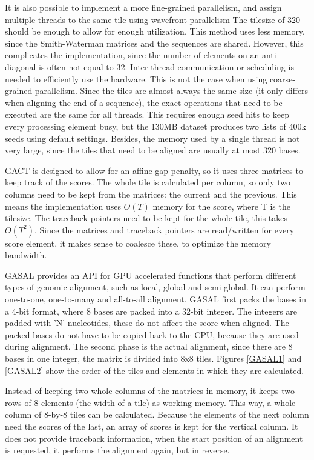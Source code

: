 \documentclass[../main/thesis.tex]{subfiles}
\begin{document}
It is also possible to implement a more fine-grained parallelism, and assign multiple threads to the same tile using wavefront parallelism %
The tilesize of 320 should be enough to allow for enough utilization.
This method uses less memory, since the Smith-Waterman matrices and the sequences are shared.
However, this complicates the implementation, since the number of elements on an anti-diagonal is often not equal to 32.
Inter-thread communication or scheduling is needed to efficiently use the hardware.
This is not the case when using coarse-grained parallelism.
Since the tiles are almost always the same size (it only differs when aligning the end of a sequence), the exact operations that need to be executed are the same for all threads.
This requires enough seed hits to keep every processing element busy, but the 130MB dataset produces two lists of 400k seeds using default settings. 
Besides, the memory used by a single thread is not very large, since the tiles that need to be aligned are usually at most 320 bases.

GACT is designed to allow for an affine gap penalty, so it uses three matrices to keep track of the scores.
The whole tile is calculated per column, so only two columns need to be kept from the matrices: the current and the previous.
This means the implementation uses $O(T)$ memory for the score, where T is the tilesize.
The traceback pointers need to be kept for the whole tile, this takes $O(T^2)$.
Since the matrices and traceback pointers are read/written for every score element, it makes sense to coalesce these, to optimize the memory bandwidth.

GASAL \cite{GASAL} provides an API for GPU accelerated functions that perform different types of genomic alignment, such as local, global and semi-global.
It can perform one-to-one, one-to-many and all-to-all alignment.
GASAL first packs the bases in a 4-bit format, where 8 bases are packed into a 32-bit integer.
The integers are padded with 'N' nucleotides, these do not affect the score when aligned.
The packed bases do not have to be copied back to the CPU, because they are used during alignment.
The second phase is the actual alignment, since there are 8 bases in one integer, the matrix is divided into 8x8 tiles.
Figures \ref{GASAL1} and \ref{GASAL2} show the order of the tiles and elements in which they are calculated.



Instead of keeping two whole columns of the matrices in memory, it keeps two rows of 8 elements (the width of a tile) as working memory.
This way, a whole column of 8-by-8 tiles can be calculated.
Because the elements of the next column need the scores of the last, an array of scores is kept for the vertical column.
It does not provide traceback information, when the start position of an alignment is requested, it performs the alignment again, but in reverse.
\end{document}
